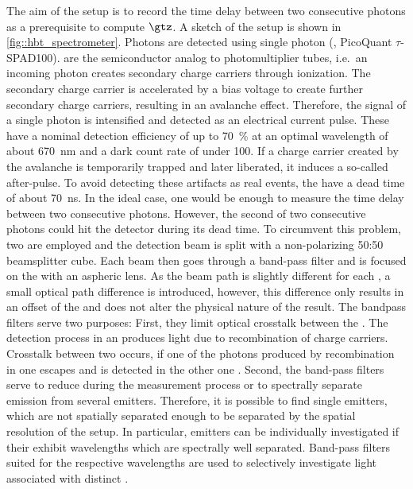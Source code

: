 		The aim of the \hbt setup is to record the time delay between two consecutive photons as a prerequisite to compute $\gtz$.
		A sketch of the \hbt setup is shown in \autoref{fig::hbt_spectrometer}.
		Photons are detected using single photon \apds (\APDs, PicoQuant $\tau${}-SPAD100).
		\APDs are the semiconductor analog to photomultiplier tubes, i.e.\ an incoming photon creates secondary charge carriers through ionization.
		The secondary charge carrier is accelerated by a bias voltage to create further secondary charge carriers, resulting in an avalanche effect.
		Therefore, the signal of a single photon is intensified and detected as an electrical current pulse.
		These \apds have a nominal detection efficiency of up to \SI{70}{\percent} at an optimal wavelength of about \SI{670}{\nm} and a dark count rate of under \SI{100}{\cps}.
		If a charge carrier created by the avalanche is temporarily trapped and later liberated, it induces a so-called after-pulse.
		To avoid detecting these artifacts as real events, the \APDs have a dead time of about \SI{70}{\ns}.
		In the ideal case, one \APD would be enough to measure the time delay between two consecutive photons.
		However, the second of two consecutive photons could hit the detector during its dead time.
		To circumvent this problem, two \APDs are employed and the detection beam is split with a non-polarizing 50:50 beamsplitter cube.
		Each beam then goes through a band-pass filter and is focused on the \apd with an aspheric lens.
		As the beam path is slightly different for each \APD, a small optical path difference is introduced, however, this difference only results in an offset of the \gtf and does not alter the physical nature of the result.
		The bandpass filters serve two purposes:
		First, they limit optical crosstalk between the \apds.
		The detection process in an \apd produces light due to recombination of charge carriers.
		Crosstalk between two \apds occurs, if one of the photons produced by recombination in one \apd escapes and is detected in the other one \cite{Younger2009}.
		Second, the band-pass filters serve to reduce \bkg during the \gt measurement process or to spectrally separate emission from several emitters.
		Therefore, it is possible to find single emitters, which are not spatially separated enough to be separated by the spatial resolution of the setup.
		In particular, emitters can be individually investigated if their \ZPLs exhibit wavelengths which are spectrally well separated.
		Band-pass filters suited for the respective wavelengths are used to selectively investigate light associated with distinct \ZPLs.
